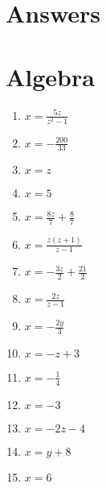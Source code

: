 \documentclass[fleqn]{exam}
\begin{document}
\newpage
\section*{Answers}

\section{Algebra}

\begin{multicols}{2}
\begin{enumerate}[label=(\alph*)]
\item $ \displaystyle x = \frac{5 z}{z^{2} - 1}$
\item $ \displaystyle x = - \frac{200}{33}$
\item $ \displaystyle x = z$
\item $ \displaystyle x = 5$
\item $ \displaystyle x = \frac{8 z}{7} + \frac{8}{7}$
\item $ \displaystyle x = \frac{z \left(z + 1\right)}{z - 1}$
\item $ \displaystyle x = - \frac{3 z}{2} + \frac{21}{2}$
\item $ \displaystyle x = \frac{2 z}{z - 1}$
\item $ \displaystyle x = - \frac{2 y}{3}$
\item $ \displaystyle x = - z + 3$
\item $ \displaystyle x = - \frac{1}{4}$
\item $ \displaystyle x = -3$
\item $ \displaystyle x = - 2 z - 4$
\item $ \displaystyle x = y + 8$
\item $ \displaystyle x = 6$

\end{enumerate}
\end{multicols}
\end{document}
